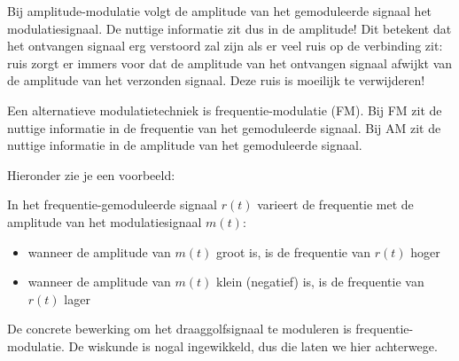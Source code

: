Bij amplitude-modulatie volgt de amplitude van het gemoduleerde signaal het modulatiesignaal. De nuttige informatie zit dus in de amplitude! Dit betekent dat het ontvangen signaal erg verstoord zal zijn als er veel ruis op de verbinding zit: ruis zorgt er immers voor dat de amplitude van het ontvangen signaal afwijkt van de amplitude van het verzonden signaal. Deze ruis is moeilijk te verwijderen!

Een alternatieve modulatietechniek is frequentie-modulatie (FM). Bij FM zit de nuttige informatie in de frequentie van het gemoduleerde signaal. Bij AM zit de nuttige informatie in de amplitude van het gemoduleerde signaal.

Hieronder zie je een voorbeeld:

\begin{center}
	
\end{center}

In het frequentie-gemoduleerde signaal $r(t)$ varieert de frequentie met de amplitude van het modulatiesignaal $m(t)$: 

\begin{itemize}
    \item wanneer de amplitude van $m(t)$ groot is, is de frequentie van $r(t)$ hoger
    \item wanneer de amplitude van $m(t)$ klein (negatief) is, is de frequentie van $r(t)$ lager
\end{itemize}

De concrete bewerking om het draaggolfsignaal te moduleren is frequentie-modulatie. De wiskunde is nogal ingewikkeld, dus die laten we hier achterwege.



